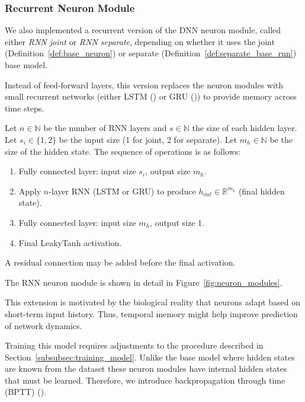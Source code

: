 \subsubsection{Recurrent Neuron Module}
\label{subsubsec:rnn_neuron_module}

We also implemented a recurrent version of the DNN neuron module, called either \emph{RNN joint} or \emph{RNN separate}, depending on whether it uses the joint (Definition~\ref{def:base_neuron}) or separate (Definition~\ref{def:separate_base_rnn}) base model.

Instead of feed-forward layers, this version replaces the neuron modules with small recurrent networks (either LSTM (\citet{hochreiter1997lstm}) or GRU (\citet{cho2014gru})) to provide memory across time steps.

\begin{defn}
    Let $n \in \mathbb{N}$ be the number of RNN layers and $s \in \mathbb{N}$ the size of each hidden layer. Let $s_i \in \{1, 2\}$ be the input size (1 for joint, 2 for separate). Let $m_h \in \mathbb{N}$ be the size of the hidden state. The sequence of operations is as follows:
    
    \begin{enumerate}
        \item Fully connected layer: input size $s_i$, output size $m_h$.
        \item Apply $n$-layer RNN (LSTM or GRU) to produce $h_{out} \in \mathbb{R}^{m_h}$ (final hidden state).
        \item Fully connected layer: input size $m_h$, output size 1.
        \item Final LeakyTanh activation.
    \end{enumerate}
    
    A residual connection may be added before the final activation.
\end{defn}
\label{def:rnn_neuron_module}

The RNN neuron module is shown in detail in Figure~\ref{fig:neuron_modules}.

This extension is motivated by the biological reality that neurons adapt based on short-term input history. Thus, temporal memory might help improve prediction of network dynamics.

Training this model requires adjustments to the procedure described in Section~\ref{subsubsec:training_model}. Unlike the base model where hidden states are known from the dataset these neuron modules have internal hidden states that must be learned. Therefore, we introduce backpropagation through time (BPTT) (\citet{webos1990btt}).

